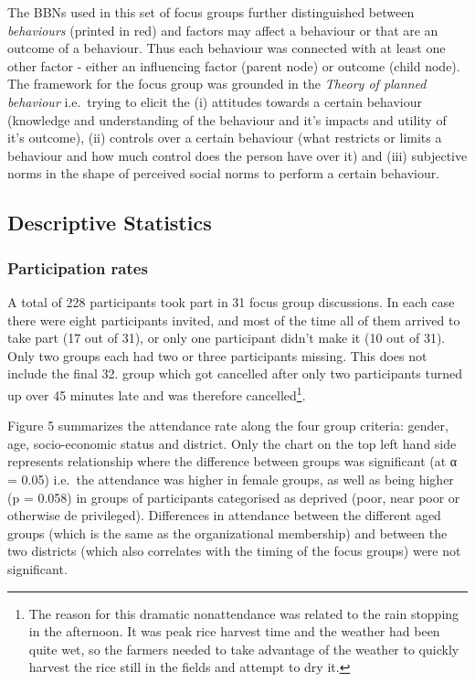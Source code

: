 \documentclass[]{article}
\let\rmarkdownfootnote\footnote%
\def\footnote{\protect\rmarkdownfootnote}
\begin{document}
The BBNs used in this set of focus groups further distinguished between
\emph{behaviours} (printed in red) and factors may affect a behaviour or
that are an outcome of a behaviour. Thus each behaviour was connected
with at least one other factor - either an influencing factor (parent
node) or outcome (child node). The framework for the focus group was
grounded in the \emph{Theory of planned behaviour} i.e.~trying to elicit
the (i) attitudes towards a certain behaviour (knowledge and
understanding of the behaviour and it's impacts and utility of it's
outcome), (ii) controls over a certain behaviour (what restricts or
limits a behaviour and how much control does the person have over it)
and (iii) subjective norms in the shape of perceived social norms to
perform a certain behaviour.

\hypertarget{descriptive-statistics}{%
\subsection{Descriptive Statistics}\label{descriptive-statistics}}

\hypertarget{participation-rates}{%
\subsubsection{Participation rates}\label{participation-rates}}

A total of 228 participants took part in 31 focus group discussions. In
each case there were eight participants invited, and most of the time
all of them arrived to take part (17 out of 31), or only one participant
didn't make it (10 out of 31). Only two groups each had two or three
participants missing. This does not include the final 32. group which
got cancelled after only two participants turned up over 45 minutes late
and was therefore cancelled\footnote{The reason for this dramatic
  nonattendance was related to the rain stopping in the afternoon. It
  was peak rice harvest time and the weather had been quite wet, so the
  farmers needed to take advantage of the weather to quickly harvest the
  rice still in the fields and attempt to dry it.}.

Figure 5 summarizes the attendance rate along the four group criteria:
gender, age, socio-economic status and district. Only the chart on the
top left hand side represents relationship where the difference between
groups was significant (at α = 0.05) i.e.~the attendance was higher in
female groups, as well as being higher (p = 0.058) in groups of
participants categorised as deprived (poor, near poor or otherwise de
privileged). Differences in attendance between the different aged groups
(which is the same as the organizational membership) and between the two
districts (which also correlates with the timing of the focus groups)
were not significant.
\end{document}

